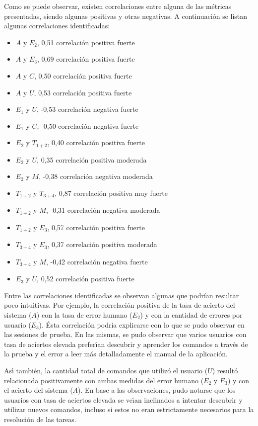 Como se puede observar, existen correlaciones entre alguna de las m\'etricas presentadas, 
siendo algunas positivas y otras negativas. A continuaci\'on se listan algunas correlaciones identificadas:

\begin{itemize}
    \item $A$ y $E_2$, 0,51 correlaci\'on positiva fuerte
    \item $A$ y $E_3$, 0,69 correlaci\'on positiva fuerte
    \item $A$ y $C$, 0,50 correlaci\'on positiva fuerte
    \item $A$ y $U$, 0,53 correlaci\'on positiva fuerte
    \item $E_1$ y $U$, -0,53 correlaci\'on negativa fuerte
    \item $E_1$ y $C$, -0,50 correlaci\'on negativa fuerte
    \item $E_2$ y $T_{1+2}$, 0,40 correlaci\'on positiva fuerte
    \item $E_2$ y $U$, 0,35 correlaci\'on positiva moderada
    \item $E_2$ y $M$, -0,38 correlaci\'on negativa moderada
    \item $T_{1+2}$ y $T_{3+4}$, 0,87 correlaci\'on positiva muy fuerte
    \item $T_{1+2}$ y $M$, -0,31 correlaci\'on negativa moderada
    \item $T_{1+2}$ y $E_3$, 0,57 correlaci\'on positiva fuerte
    \item $T_{3+4}$ y $E_3$, 0,37 correlaci\'on positiva moderada
    \item $T_{3+4}$ y $M$, -0,42 correlaci\'on negativa fuerte
    \item $E_3$ y $U$, 0,52 correlaci\'on positiva fuerte
\end{itemize}

Entre las correlaciones identificadas se observan algunas que podr\'ian resultar poco intuitivas. Por ejemplo, 
la correlaci\'on positiva de la tasa de acierto del sistema ($A$) con la tasa de error humano ($E_2$) y 
con la cantidad de errores por usuario ($E_3$). \'Esta correlaci\'on podr\'ia explicarse con lo que se pudo
observar en las sesiones de prueba. En las mismas, se pudo observar que varios usuarios con tasa de aciertos elevada
prefer{{\'\i}}an descubrir y aprender los comandos a trav\'es de la prueba y el error a leer 
m\'as detalladamente el manual de la aplicaci\'on.

As{{\'\i}} tambi\'en, la cantidad total de comandos que utiliz\'o el usuario ($U$) result\'o relacionada
positivamente con ambas medidas del error humano ($E_2$ y $E_3$) y con el acierto del sistema ($A$). 
En base a las observaciones, pudo notarse que los usuarios con tasa de aciertos elevada
se ve{{\'\i}}an inclinados a intentar descubrir y utilizar nuevos comandos, incluso si estos no 
eran estrictamente necesarios para la resoluci\'on de las tareas.

